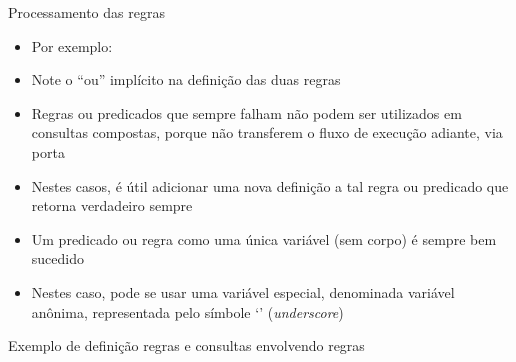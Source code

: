 \begin{frame}[fragile]{Processamento das regras}

    \begin{itemize}
        \item Por exemplo:


        \item Note o ``ou'' implícito na definição das duas regras

        \item Regras ou predicados que sempre falham não podem ser utilizados em consultas 
            compostas, porque não transferem o fluxo de execução adiante, via porta 

        \item Nestes casos, é útil adicionar uma nova definição a tal regra ou predicado que 
            retorna verdadeiro sempre

        \item Um predicado ou regra como uma única variável (sem corpo) é sempre bem sucedido

        \item Nestes caso, pode se usar uma variável especial, denominada variável anônima,
            representada pelo símbole `' (\textit{underscore})

    \end{itemize}

\end{frame}


\begin{frame}[fragile]{Exemplo de definição regras e consultas envolvendo regras}


\end{frame}

